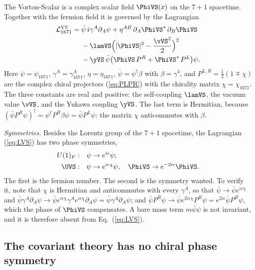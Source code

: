 The Vorton-Scalar is a complex scalar field $\PhiVS(x)$ on the $7+1$ spacetime. Together with the
fermion field it is governed by the Lagrangian
\begin{align}
\mathcal L_{1671}^{\rm VS}={}&\bar\psi\,i\gamma^A\partial_A\psi
+\eta^{AB}\,\partial_A\PhiVS^{*}\,\partial_B\PhiVS\nonumber\\
&-\lamVS\Big(|\PhiVS|^2-\frac{\vVS^2}{2}\Big)^{2}\nonumber\\
&-\yVS\,\bar\psi\big(\PhiVS\,P^{R}+\PhiVS^{*}\,P^{L}\big)\psi .
\label{eq:LVS}
\end{align}
Here $\psi=\psi_{1671}$, $\gamma^A=\gamma_{1671}^A$, $\eta=\eta_{1671}$, $\bar\psi=\psi^\dagger\beta$
with $\beta=\gamma^4$, and $P^{L,R}=\tfrac12(1\mp\chi)$ are the complex chiral projectors
(\ref{eq:PLPR}) with the chirality matrix $\chi=\chi_{1671}$. The three constants are real and
positive: the self-coupling $\lamVS$, the vacuum value $\vVS$, and the Yukawa coupling $\yVS$. The last
term is Hermitian, because $(\bar\psi P^{R}\psi)^\dagger=\psi^\dagger P^{R}\beta\psi=\bar\psi P^{L}\psi$:
the matrix $\chi$ anticommutes with $\beta$.

\emph{Symmetries.} Besides the Lorentz group of the $7+1$ spacetime, the Lagrangian (\ref{eq:LVS}) has
two phase symmetries,
\begin{align}
U(1)_F:&\quad\psi\to e^{i\epsilon}\psi;\nonumber\\
\UVS:&\quad\psi\to e^{i\epsilon\chi}\psi,\quad\PhiVS\to e^{-2i\epsilon}\PhiVS .
\label{eq:U1}
\end{align}
The first is the fermion number. The second is the symmetry wanted. To verify it, note that $\chi$ is
Hermitian and anticommutes with every $\gamma^A$, so that $\bar\psi\to\bar\psi e^{i\epsilon\chi}$ and
$\bar\psi\gamma^A\partial_A\psi\to\bar\psi e^{i\epsilon\chi}\gamma^Ae^{i\epsilon\chi}\partial_A\psi
=\bar\psi\gamma^A\partial_A\psi$; and
$\bar\psi P^{R}\psi\to\bar\psi e^{2i\epsilon\chi}P^{R}\psi=e^{2i\epsilon}\bar\psi P^{R}\psi$, which
the phase of $\PhiVS$ compensates. A bare mass term $m\bar\psi\psi$ is not invariant, and it is
therefore absent from Eq.~(\ref{eq:LVS}).
\subsection{The covariant theory has no chiral phase symmetry}
\label{sec:nogo}

